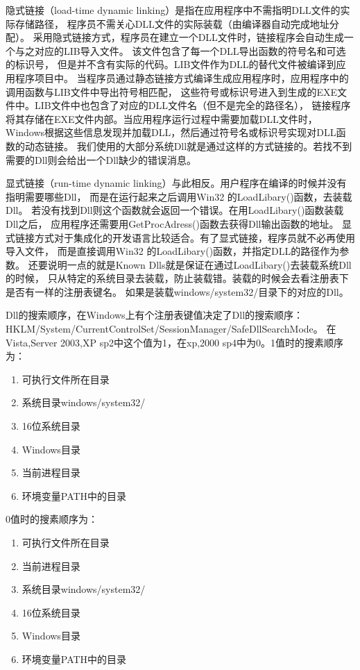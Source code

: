 \documentclass{book}
\begin{document}
隐式链接（load-time dynamic linking）是指在应用程序中不需指明DLL文件的实际存储路径，
程序员不需关心DLL文件的实际装载（由编译器自动完成地址分配）。
采用隐式链接方式，程序员在建立一个DLL文件时，链接程序会自动生成一个与之对应的LIB导入文件。
该文件包含了每一个DLL导出函数的符号名和可选的标识号，
但是并不含有实际的代码。LIB文件作为DLL的替代文件被编译到应用程序项目中。
当程序员通过静态链接方式编译生成应用程序时，应用程序中的调用函数与LIB文件中导出符号相匹配，
这些符号或标识号进入到生成的EXE文件中。LIB文件中也包含了对应的DLL文件名（但不是完全的路径名），
链接程序将其存储在EXE文件内部。当应用程序运行过程中需要加载DLL文件时，
Windows根据这些信息发现并加载DLL，然后通过符号名或标识号实现对DLL函数的动态链接。
我们使用的大部分系统Dll就是通过这样的方式链接的。若找不到需要的Dll则会给出一个Dll缺少的错误消息。
         
显式链接（run-time dynamic linking）与此相反。用户程序在编译的时候并没有指明需要哪些Dll，
而是在运行起来之后调用Win32 的LoadLibary()函数，去装载Dll。
若没有找到Dll则这个函数就会返回一个错误。在用LoadLibary()函数装载Dll之后，
应用程序还需要用GetProcAdress()函数去获得Dll输出函数的地址。
显式链接方式对于集成化的开发语言比较适合。有了显式链接，程序员就不必再使用导入文件，
而是直接调用Win32 的LoadLibary()函数，并指定DLL的路径作为参数。
还要说明一点的就是Known Dlls就是保证在通过LoadLibary()去装载系统Dll的时候，
只从特定的系统目录去装载，防止装载错。装载的时候会去看注册表下是否有一样的注册表键名。
如果是装载windows/system32/目录下的对应的Dll。

Dll的搜索顺序，在Windows上有个注册表键值决定了Dll的搜索顺序：
HKLM/System/CurrentControlSet/SessionManager/SafeDllSearchMode。
在Vista,Server 2003,XP sp2中这个值为1，在xp,2000 sp4中为0。1值时的搜素顺序为：

\begin{enumerate}
\setcounter{enumi}{0}
\item{可执行文件所在目录}
\item{系统目录windows/system32/}
\item{16位系统目录}
\item{Windows目录}
\item{当前进程目录}
\item{环境变量PATH中的目录}
\end{enumerate}

0值时的搜素顺序为：

\begin{enumerate}
\setcounter{enumi}{0}
\item{可执行文件所在目录}
\item{当前进程目录}
\item{系统目录windows/system32/}
\item{16位系统目录}
\item{Windows目录}
\item{环境变量PATH中的目录}
\end{enumerate}
\end{document}
